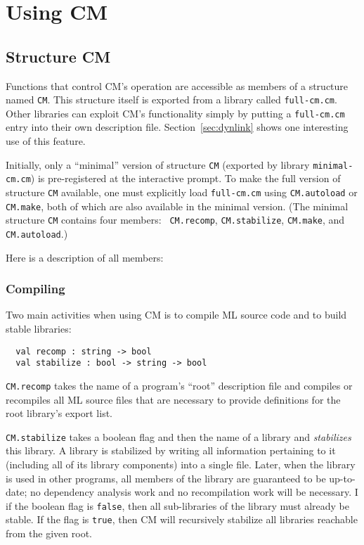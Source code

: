\documentclass{article}
\begin{document}
\section{Using CM}

\subsection{Structure CM}
\label{sec:api}

Functions that control CM's operation are accessible as members of a
structure named {\tt CM}.  This structure itself is exported from a
library called {\tt full-cm.cm}.  Other libraries can exploit CM's
functionality simply by putting a {\tt full-cm.cm} entry into their
own description file.  Section~\ref{sec:dynlink} shows one
interesting use of this feature.

Initially, only a ``minimal'' version of structure {\tt CM} (exported
by library {\tt minimal-cm.cm}) is pre-registered at the interactive
prompt.  To make the full version of structure {\tt CM} available, one
must explicitly load {\tt full-cm.cm} using {\tt CM.autoload} or {\tt
CM.make}, both of which are also available in the minimal version.
(The minimal structure {\tt CM} contains four members: {\tt
CM.recomp}, {\tt CM.stabilize}, {\tt CM.make}, and {\tt CM.autoload}.)

Here is a description of all members:

\subsubsection*{Compiling}

Two main activities when using CM is to compile ML source code and to
build stable libraries:

\begin{verbatim}
  val recomp : string -> bool
  val stabilize : bool -> string -> bool
\end{verbatim}

{\tt CM.recomp} takes the name of a program's ``root'' description
file and compiles or recompiles all ML source files that are necessary
to provide definitions for the root library's export list.

{\tt CM.stabilize} takes a boolean flag and then the name of a library
and {\em stabilizes} this library.  A library is stabilized by writing
all information pertaining to it (including all of its library
components) into a single file.  Later, when the library is used in
other programs, all members of the library are guaranteed to be
up-to-date; no dependency analysis work and no recompilation work will
be necessary.  I if the boolean flag is {\tt false}, then all
sub-libraries of the library must already be stable.  If the flag is
{\tt true}, then CM will recursively stabilize all libraries reachable
from the given root.
\end{document}
